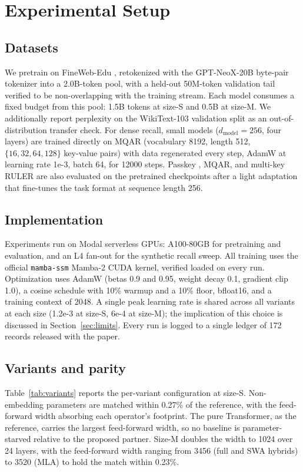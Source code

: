 \documentclass[conference]{IEEEtran}
\begin{document}
\section{Experimental Setup}
\label{sec:setup}

\subsection{Datasets}
We pretrain on FineWeb-Edu \cite{fineweb}, retokenized with the GPT-NeoX-20B byte-pair tokenizer \cite{pythia} into a 2.0B-token pool, with a held-out 50M-token validation tail verified to be non-overlapping with the training stream. Each model consumes a fixed budget from this pool: 1.5B tokens at size-S and 0.5B at size-M. We additionally report perplexity on the WikiText-103 validation split \cite{wikitext} as an out-of-distribution transfer check. For dense recall, small models ($d_{\text{model}} = 256$, four layers) are trained directly on MQAR (vocabulary 8192, length 512, $\{16,32,64,128\}$ key-value pairs) with data regenerated every step, AdamW at learning rate 1e-3, batch 64, for 12000 steps. Passkey \cite{passkey}, MQAR, and multi-key RULER are also evaluated on the pretrained checkpoints after a light adaptation that fine-tunes the task format at sequence length 256.

\subsection{Implementation}
Experiments run on Modal serverless GPUs: A100-80GB for pretraining and evaluation, and an L4 fan-out for the synthetic recall sweep. All training uses the official \texttt{mamba-ssm} Mamba-2 CUDA kernel, verified loaded on every run. Optimization uses AdamW (betas 0.9 and 0.95, weight decay 0.1, gradient clip 1.0), a cosine schedule with 10\% warmup and a 10\% floor, bfloat16, and a training context of 2048. A single peak learning rate is shared across all variants at each size (1.2e-3 at size-S, 6e-4 at size-M); the implication of this choice is discussed in Section~\ref{sec:limits}. Every run is logged to a single ledger of 172 records released with the paper.

\subsection{Variants and parity}
Table~\ref{tab:variants} reports the per-variant configuration at size-S. Non-embedding parameters are matched within 0.27\% of the reference, with the feed-forward width absorbing each operator's footprint. The pure Transformer, as the reference, carries the largest feed-forward width, so no baseline is parameter-starved relative to the proposed partner. Size-M doubles the width to 1024 over 24 layers, with the feed-forward width ranging from 3456 (full and SWA hybrids) to 3520 (MLA) to hold the match within 0.23\%.
\end{document}
